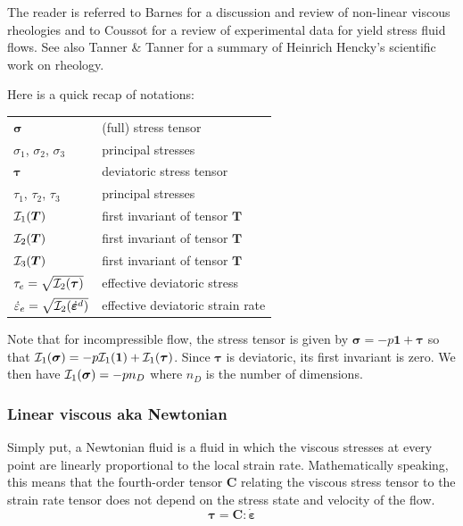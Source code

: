 

The reader is referred to Barnes \cite{barn99}
for a discussion and review of non-linear viscous rheologies and 
to Coussot \cite{cous14} for a review of experimental data for yield stress fluid
flows. See also Tanner \& Tanner \cite{tata03} for a summary of Heinrich Hencky's 
scientific work on rheology. 

Here is a quick recap of notations:

\begin{center}
\begin{tabular}{ll}
\hline
${\bm \sigma}$ & (full) stress tensor \\
$\sigma_1$, $\sigma_2$, $\sigma_3$ & principal stresses \\ 
${\bm \tau}$   & deviatoric stress tensor \\
$\tau_1$, $\tau_2$, $\tau_3$ & principal stresses \\ 
${\cal I}_1({\bm T})$ & first invariant of tensor ${\bm T}$ \\
${\cal I}_2({\bm T})$ & first invariant of tensor ${\bm T}$ \\
${\cal I}_3({\bm T})$ & first invariant of tensor ${\bm T}$ \\
${\tau}_{e}=\sqrt{{\cal I}_2({\bm \tau})}$ & effective deviatoric stress \\
$\dot{{\varepsilon}}_{e}=\sqrt{{\cal I}_2(\dot{\bm \varepsilon}^d)}$ & effective deviatoric strain rate \\
\hline
\end{tabular}
\end{center}

Note that for incompressible flow, the stress tensor is given by 
${\bm \sigma}=-p {\bm 1} + {\bm \tau}$ so that 
${\cal I}_1({\bm \sigma})=-p {\cal I}_1({\bm 1}) + {\cal I}_1({\bm \tau})$.
Since ${\bm \tau}$ is deviatoric, its first invariant is zero. We then have
${\cal I}_1({\bm \sigma})=-p n_D$ where $n_D$ is the number of dimensions.

\subsubsection{Linear viscous aka Newtonian} 

Simply put, a Newtonian fluid is a fluid in which the viscous stresses at every point are linearly proportional 
to the local strain rate.
Mathematically speaking, this means that the fourth-order tensor ${\bm C}$ relating the viscous stress 
tensor to the strain rate tensor does not depend on the stress state and velocity of the flow.
\[
{\bm \tau}={\bm C} : \dot{\bm \varepsilon}
\]

